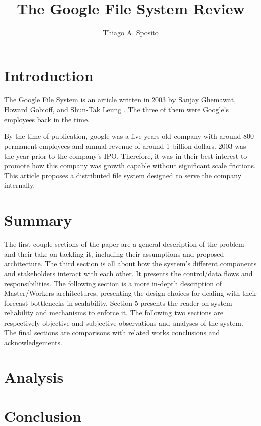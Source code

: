 \documentclass[12pt]{article}
\title{The Google File System Review}
\author{Thiago A. Sposito\inst{1} }
\begin{document}
 

\maketitle


\section{Introduction}

The Google File System is an article written in 2003 by Sanjay Ghemawat, Howard Gobioff, and Shun-Tak Leung \cite{ghemawat2003google}. The three of them were Google's employees back in the time.

By the time of publication, google was a five years old company with around 800 permanent employees \cite{google_coorp_info} and annual revenue of around 1 billion dollars. 2003 was the year prior to the company's IPO\cite{katje_2020}. Therefore, it was in their best interest to promote how this company was growth capable without significant scale frictions. This article proposes a distributed file system designed to serve the company internally.

\section{Summary} 
The first couple sections of the paper are a general description of the problem and their take on tackling it, including their assumptions and proposed architecture. The third section is all about how the system's different components and stakeholders interact with each other. It presents the control/data flows and responsibilities. The following section is a more in-depth description of Master/Workers architectures, presenting the design choices for dealing with their forecast bottlenecks in scalability. Section 5 presents the reader on system reliability and mechanisms to enforce it. The following two sections are respectively objective and subjective observations and analyses of the system. The final sections are comparisons with related works conclusions and acknowledgements. 


\section{Analysis}




\section{Conclusion}






\end{document}
